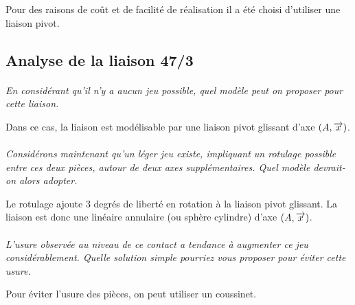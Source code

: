 \documentclass[11pt,oneside]{article}
\begin{document}
Pour des raisons de coût et de facilité de réalisation il a été choisi d'utiliser une liaison pivot.

\subsection*{Analyse de la liaison 47/3}


\paragraph{}
\textit{En considérant qu'il n'y a aucun jeu possible,  quel modèle peut on proposer pour cette liaison.}

Dans ce cas, la liaison est modélisable par une liaison pivot glissant d'axe $(A,\overrightarrow{x})$.

\paragraph{}
\textit{Considérons maintenant qu'un léger jeu existe, impliquant un rotulage possible entre ces deux pièces, autour de deux axes supplémentaires. Quel modèle devrait-on alors adopter.}

Le rotulage ajoute 3 degrés de liberté en rotation à la liaison pivot glissant. La liaison est donc une linéaire annulaire (ou sphère cylindre) d'axe $(A,\overrightarrow{x})$.

\paragraph{}
\textit{L'usure observée au niveau de ce contact a tendance à augmenter ce jeu considérablement. Quelle solution simple pourriez vous proposer pour éviter cette usure.}
 
Pour éviter l'usure des pièces, on peut utiliser un coussinet.
\end{document}
